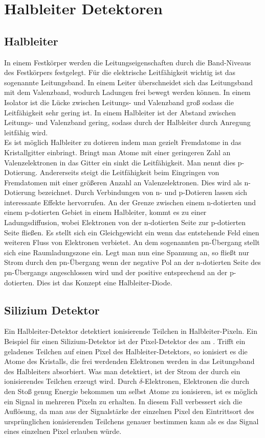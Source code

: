 \section{Halbleiter Detektoren}
\subsection{Halbleiter}
In einem Festkörper werden die Leitungseigenschaften durch die Band-Niveaus des Festkörpers festgelegt. Für die elektrische Leitfähigkeit wichtig ist das sogenannte Leitungsband. In einem Leiter überschneidet sich das Leitungsband mit dem Valenzband, wodurch Ladungen frei bewegt werden können. In einem Isolator ist die Lücke zwischen Leitungs- und Valenzband groß sodass die Leitfähigkeit sehr gering ist. In einem Halbleiter ist der Abstand zwischen Leitungs- und Valenzband gering, sodass durch der Halbleiter durch Anregung leitfähig wird.
\\
Es ist möglich Halbleiter zu dotieren indem man gezielt Fremdatome in das Kristallgitter einbringt. Bringt man Atome mit einer geringeren Zahl an Valenzelektronen in das Gitter ein sinkt die Leitfähigkeit. Man nennt dies p-Dotierung. Andererseits steigt die Leitfähigkeit beim Eingringen von Fremdatomen mit einer größeren Anzahl an Valenzelektronen. Dies wird als n-Dotierung bezeichnet. Durch Verbindungen von n- und p-Dotieren lassen sich interessante Effekte hervorrufen. An der Grenze zwischen einem n-dotierten und einem p-dotierten Gebiet in einem Halbleiter, kommt es zu einer Ladungsdiffusion, wobei Elektronen von der n-dotierten Seite zur p-dotierten Seite fließen. Es stellt sich ein Gleichgewicht ein wenn das entstehende Feld einen weiteren Fluss von Elektronen verbietet. An dem sogenannten pn-Übergang stellt sich eine Raumladungszone ein. Legt man nun eine Spannung an, so fließt nur Strom durch den pn-Übergang wenn der negative Pol an der n-dotierten Seite des pn-Übergangs angeschlossen wird und der positive entsprechend an der p-dotierten. Dies ist das Konzept eine Halbleiter-Diode.
\subsection{Silizium Detektor}
Ein Halbleiter-Detektor detektiert ionisierende Teilchen in Halbleiter-Pixeln. Ein Beispiel für einen Silizium-Detektor ist der Pixel-Detektor des \atlas am \lhc. 
Trifft ein geladenes Teilchen auf einen Pixel des Halbleiter-Detektors, so ionisiert es die Atome des Kristalls, die frei werdenden Elektronen werden in das Leitungsband des Halbleiters absorbiert. Was man detektiert, ist der Strom der durch ein ionisierendes Teilchen erzeugt wird. Durch $\delta$-Elektronen, Elektronen die durch den Stoß genug Energie bekommen um selbst Atome zu ionisieren, ist es möglich ein Signal in mehreren Pixeln zu erhalten. In diesem Fall verbessert sich die Auflösung, da man aus der Signalstärke der einzelnen Pixel den Eintrittsort des ursprünglichen ionisierenden Teilchens genauer bestimmen kann als es das Signal eines einzelnen Pixel erlauben würde.
